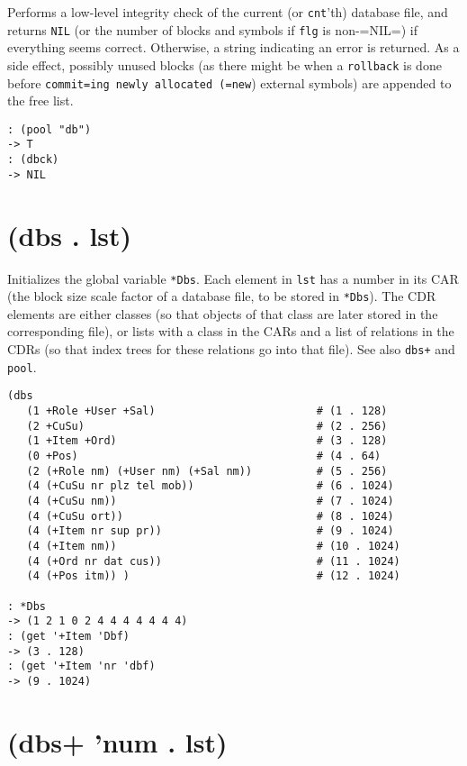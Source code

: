 {{Performs a low-level integrity check of the current (or \texttt{cnt}'th)
database file, and returns \texttt{NIL} (or the number of blocks and symbols if
\texttt{flg} is non-=NIL=) if everything seems correct. Otherwise, a string
indicating an error is returned. As a side effect, possibly unused
blocks (as there might be when a \texttt{rollback} is done before \texttt{commit=ing newly allocated (=new}) external symbols) are appended to the free list.


\begin{verbatim}
: (pool "db")
-> T
: (dbck)
-> NIL
\end{verbatim}

 
\section{(dbs . lst)}
\label{sec-8-1-4-18}


Initializes the global variable \texttt{*Dbs}. Each element in \texttt{lst} has a
number in its CAR (the block size scale factor of a database file, to be
stored in \texttt{*Dbs}). The CDR elements are either classes (so that objects
of that class are later stored in the corresponding file), or lists with
a class in the CARs and a list of relations in the CDRs (so that index
trees for these relations go into that file). See also \texttt{dbs+} and
\texttt{pool}.


\begin{verbatim}
(dbs
   (1 +Role +User +Sal)                         # (1 . 128)
   (2 +CuSu)                                    # (2 . 256)
   (1 +Item +Ord)                               # (3 . 128)
   (0 +Pos)                                     # (4 . 64)
   (2 (+Role nm) (+User nm) (+Sal nm))          # (5 . 256)
   (4 (+CuSu nr plz tel mob))                   # (6 . 1024)
   (4 (+CuSu nm))                               # (7 . 1024)
   (4 (+CuSu ort))                              # (8 . 1024)
   (4 (+Item nr sup pr))                        # (9 . 1024)
   (4 (+Item nm))                               # (10 . 1024)
   (4 (+Ord nr dat cus))                        # (11 . 1024)
   (4 (+Pos itm)) )                             # (12 . 1024)

: *Dbs
-> (1 2 1 0 2 4 4 4 4 4 4 4)
: (get '+Item 'Dbf)
-> (3 . 128)
: (get '+Item 'nr 'dbf)
-> (9 . 1024)
\end{verbatim}

 
\section{(dbs+ 'num . lst)}
\label{sec-8-1-4-19}


}}

